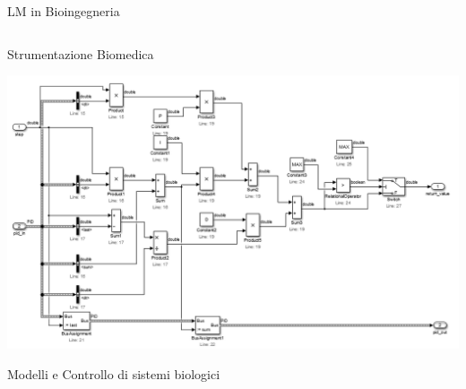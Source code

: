 \documentclass{beamer}
\begin{document}
\begin{frame}{LM in Bioingegneria}
\begin{columns}
\begin{column}{0.4\textwidth}
				Strumentazione Biomedica

				\vspace{1cm}
				\includegraphics[width=\textwidth]{sistema_bio.png}

				Modelli e Controllo di sistemi biologici
			\end{column}
		\end{columns}
	\end{frame}
\end{document}
